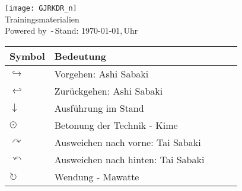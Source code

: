 \setcounter{num}{0}
\setcounter{numz}{0}
\begin{tcolorbox}[colframe=SGL2,colback=white,coltitle=black,title=G\={o}j\={u}-Ry\={u} Karate-D\={o} Langenfeld-Reusrath]
	\begin{center}
		\texttt{[image: GJRKDR\_n]}\\
		Trainingsmaterialien\\{\scriptsize \textsf{Powered by} \LaTeXe \textsf{\,-\,Stand: \today,\,\currenttime Uhr}} 
	\end{center}
\end{tcolorbox}
\clearpage
\pagebreak
\setcounter{num}{0}
\setcounter{numz}{0}	
\begin{tcolorbox}[colframe=SGL2,colback=white,coltitle=black,title=Allgemeines:\indent Erläuterungen]
	\begin{tabularx}{\textwidth}{lllll}
		Symbol	& Bedeutung	& &&\\
		\midrule
		\(\hookrightarrow\) 	& Vorgehen: Ashi Sabaki					& & &\\
		\(\hookleftarrow\) 		& Zurückgehen: Ashi Sabaki				& & &\\
		\(\downarrow\) 			& Ausführung im Stand					& & &\\
		\(\odot\) 				& Betonung der Technik - Kime			& & &\\
		\(\curvearrowright\)	& Ausweichen nach vorne: Tai Sabaki		& & &\\
		\(\curvearrowleft\)		& Ausweichen nach hinten: Tai Sabaki	& & &\\
		\(\circlearrowright\)	& Wendung - Mawatte						& & &\\
	\end{tabularx}
\end{tcolorbox}
\clearpage
\pagebreak
